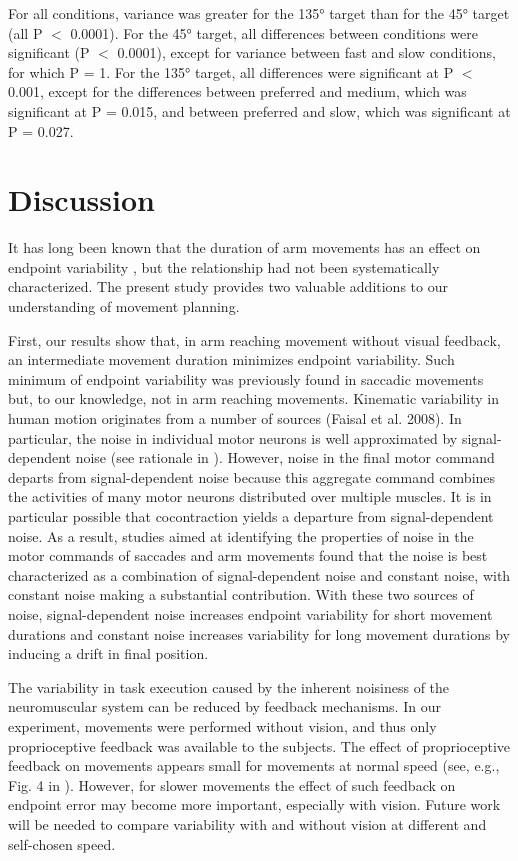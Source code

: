 For all conditions, variance was greater for the \ang{135} target
than for the \ang{45} target (all P $<$ 0.0001). For the \ang{45} target, all differences between conditions were significant (P $<$ 0.0001), except for variance between fast and slow conditions, for which P = 1. For the \ang{135} target, all differences were significant at P $<$ 0.001, except for the differences between preferred and medium, which was significant at P = 0.015, and between preferred and slow, which was significant at P = 0.027.

\section{Discussion}

It has long been known that the duration of arm movements has an effect on endpoint variability \cite{Fitts1954, Woodworth1899}, but the relationship had not been systematically characterized. The present study provides two valuable additions to our understanding of movement planning.

First, our results show that, in arm reaching movement without visual feedback, an intermediate movement duration minimizes endpoint variability. Such minimum of endpoint variability was previously found in saccadic movements \cite{VanBeers2008} but, to our knowledge, not in arm reaching movements. Kinematic variability in human motion originates from a number of sources \cite{Faisal2008} (Faisal et al. 2008). In particular, the noise in individual motor neurons is well approximated by signal-dependent noise (see rationale in \cite{Harris1998}). However, noise in the final motor command departs from signal-dependent noise because this aggregate command combines the activities of many motor neurons distributed over multiple muscles. It is in particular possible that cocontraction yields a departure from signal-dependent noise. As a result, studies aimed at identifying the properties of noise in the motor commands of saccades \cite{VanBeers2007} and arm movements \cite{VanBeers2004} found that the noise is best characterized as a combination of signal-dependent noise and constant noise, with constant noise making a substantial contribution. With these two sources of noise, signal-dependent noise increases endpoint variability for short movement durations and constant noise increases variability for long movement durations by inducing a drift in final position.

The variability in task execution caused by the inherent noisiness of the neuromuscular system can be reduced by feedback mechanisms. In our experiment, movements were performed without vision, and thus only proprioceptive feedback was available to the subjects. 
The effect of proprioceptive feedback on movements appears small for movements at normal speed (see, e.g., Fig. 4 in \cite{Franklin2007}). However, for slower movements the effect of such feedback on endpoint error may become more important, especially with vision. Future work will be needed to compare variability with and without vision at different and self-chosen speed.

